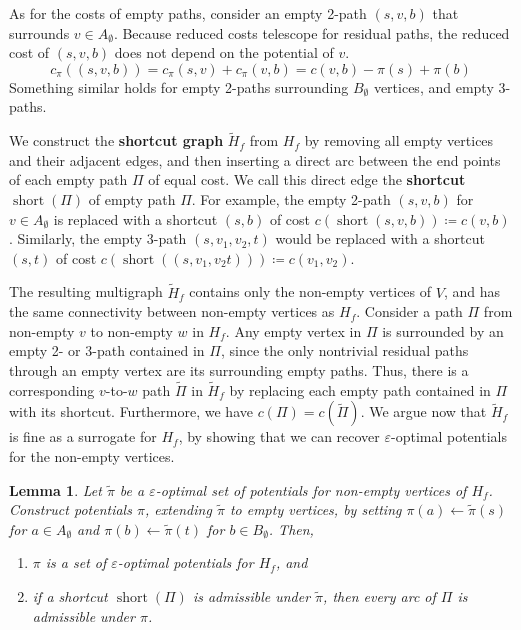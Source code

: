 \documentclass[11pt]{article}
\def\eps{\varepsilon}
\def\short{\operatorname{short}}
\theoremstyle{plain}
\newtheorem{lemma}{Lemma}[section]
\numberwithin{figure}{section}
\def\EMPH#1{\textbf{\boldmath #1}}
\begin{document}
As for the costs of empty paths, consider an empty 2-path $(s, v, b)$ that
surrounds $v \in A_\emptyset$.
Because reduced costs telescope for residual paths, the reduced cost of
$(s, v, b)$ does not depend on the potential of $v$.
\begin{equation*}
	c_\pi((s, v, b)) = c_\pi(s, v) + c_\pi(v, b) = c(v, b) - \pi(s) + \pi(b)
\end{equation*}
Something similar holds for empty 2-paths surrounding $B_\emptyset$ vertices,
and empty 3-paths.

We construct the \EMPH{shortcut graph} $\tilde{H}_f$ from $H_f$ by removing all
empty vertices and their adjacent edges, and then inserting a direct arc
between the end points of each empty path $\Pi$ of equal cost.
We call this direct edge the \EMPH{shortcut} $\short(\Pi)$ of empty path $\Pi$.
For example, the empty 2-path $(s, v, b)$ for $v \in A_\emptyset$ is replaced
with a shortcut $(s, b)$ of cost $c(\short(s, v, b)) \coloneqq c(v, b)$.
Similarly, the empty 3-path $(s, v_1, v_2, t)$ would be replaced with a
shortcut $(s, t)$ of cost $c(\short((s, v_1, v_2 t))) \coloneqq c(v_1, v_2)$.

The resulting multigraph $\tilde{H}_f$ contains only the non-empty vertices of
$V$, and has the same connectivity between non-empty vertices as $H_f$.
Consider a path $\Pi$ from non-empty $v$ to non-empty $w$ in $H_f$.
Any empty vertex in $\Pi$ is surrounded by an empty 2- or 3-path contained
in $\Pi$, since the only nontrivial residual paths through an empty vertex are
its surrounding empty paths.
Thus, there is a corresponding $v$-to-$w$ path $\tilde{\Pi}$ in $\tilde{H}_f$
by replacing each empty path contained in $\Pi$ with its shortcut.
Furthermore, we have $c(\Pi) = c(\tilde{\Pi})$.
We argue now that $\tilde{H}_f$ is fine as a surrogate for $H_f$, by showing
that we can recover $\eps$-optimal potentials for the non-empty vertices.

\begin{lemma}
\label{lemma:empty_correct}
Let $\tilde{\pi}$ be a $\eps$-optimal set of potentials for non-empty
vertices of $H_f$.
Construct potentials $\pi$, extending $\tilde{\pi}$ to empty vertices, by
setting $\pi(a) \gets \tilde{\pi}(s)$ for $a \in A_\emptyset$ and
$\pi(b) \gets \tilde{\pi}(t)$ for $b \in B_\emptyset$.
Then,
\begin{enumerate}
\item $\pi$ is a set of $\eps$-optimal potentials for $H_f$, and
\item if a shortcut $\short(\Pi)$ is admissible under $\tilde{\pi}$,
	then every arc of $\Pi$ is admissible under $\pi$.
\end{enumerate}
\end{lemma}
\end{document}
